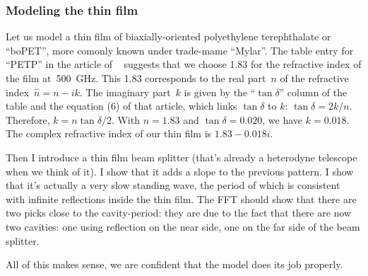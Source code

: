 
\subsubsection{Modeling the thin film}

Let us model a thin film of biaxially-oriented polyethylene terephthalate or ``boPET'', more comonly known under trade-mame ``Mylar''.
The table entry for ``PETP'' in the article of \citeauthor{lamb1996miscellaneous}~\cite{lamb1996miscellaneous} suggests that we choose 1.83 for the refractive index of the film at~\SI{500}{\giga\hertz}.
This 1.83 corresponds to the real part~$n$ of the refractive index~$\hat{n}=n-ik$.
The imaginary part~$k$ is given by the ``$\tan \delta$'' column of the table and
the equation (6) of that article, which links $\tan \delta$ to $k$: $\tan \delta = 2k/n$.
Therefore, $k = n \tan \delta / 2$.
With $n=1.83$ and $\tan \delta = 0.020$, we have $k=0.018$.
The complex refractive index of our thin film is $1.83-0.018i$.





Then I introduce a thin film beam splitter (that's already a heterodyne telescope when we think of it).  I show that it adds a slope to the previous pattern.  I show that it's actually a very slow standing wave, the period of which is consistent with infinite reflections inside the thin film.  The FFT should show that there are two picks close to the cavity-period: they are due to the fact that there are now two cavities: one using reflection on the near side, one on the far side of the beam splitter.

All of this makes sense, we are confident that the model does its job properly.
